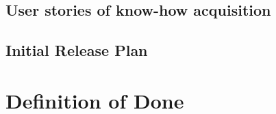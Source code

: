 \documentclass[oneside]{tudelft-report}
\begin{document}
\section{User stories of know-how acquisition}


\section{Initial Release Plan}


\setcounter{chapter}{4}

\chapter{Definition of Done}


\printglossaries

\end{document}
